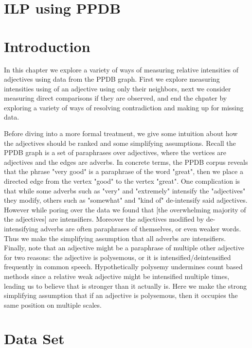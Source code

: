 \section{ILP using PPDB}

\section{Introduction}

In this chapter we explore a variety of ways of measuring relative intensities of adjectives using data from the PPDB graph. First we explore measuring intensities using of an adjective using only their neighbors, next we consider measuring direct comparisons if they are observed, and end the chpater by exploring a variety of ways of resolving contradiction and making up for missing data.

Before diving into a more formal treatment, we give some intuition about how the adjectives should be ranked and some simplifying assumptions. Recall the PPDB graph is a set of paraphrases over adjectives, where the vertices are adjectives and the edges are adverbs. In concrete terms, the PPDB corpus reveals that the phrase "very good" is a paraphrase of the word "great", then we place a directed edge from the vertex "good" to the vertex "great". One complication is that while some adverbs such as "very" and "extremely" intensify the "adjectives" they modify, others such as "somewhat" and "kind of" de-intensify said adjectives. However while poring over the data we found that [the overwhelming majority of the adjectives] are intensifiers. Moreover the adjectives modified by de-intensifying adverbs are often paraphrases of themselves, or even weaker words. Thus we make the simplifying assumption that all adverbs are intensifiers. Finally, note that an adjective might be a paraphrase of multiple other adjective for two reasons: the adjective is polysemous, or it is intensified/deintensified frequently in common speech. Hypothetically polysemy undermines count based methods since a relative weak adjective might be intensified multiple times, leading us to believe that is stronger than it actually is. Here we make the strong simplifying assumption that if an adjective is polysemous, then it occupies the same position on multiple scales.

\section{Data Set}

